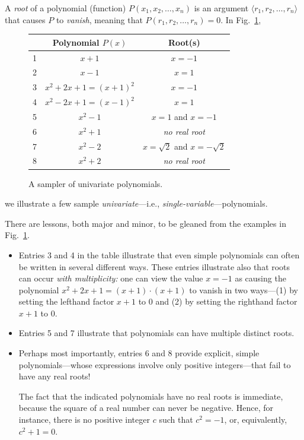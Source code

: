 \bigskip


A {\it root}  of a
polynomial (function) $P(x_1, x_2, \ldots, x_n)$ is an argument $\langle r_1, r_2, \ldots, r_n \rangle$ that causes $P$ to {\it vanish}, meaning that $P(r_1, r_2, \ldots, r_n) = 0$.  In Fig.~\ref{fig:sample-polys},
 \begin{figure}[htb]
\begin{center}
\begin{tabular}{|c|c|c|}
\hline
 & Polynomial $P(x)$ & Root(s) \\
\hline
1 &
$x+1$  &  $x= -1$ \\
2 &
$x-1$  &  $x= 1$ \\
3 &
$x^2 + 2x +1 = (x+1)^2$ & $x = -1$ \\ 
4 &
$x^2 - 2x +1 = (x-1)^2$ & $x = 1$ \\ 
5 &
$x^2 - 1$ & $x = 1$ and $x= -1$ \\
6 &
$x^2 + 1$ & {\em no real root} \\
7 &
$x^2 -2$  & $x = \sqrt{2}$ and $x = - \sqrt{2}$ \\
8 &
$x^2 + 2$ & {\em no real root} \\
\hline
\end{tabular}
\end{center} 
 \caption{A sampler of univariate polynomials.}
 \label{fig:sample-polys}
 \end{figure}
we illustrate a few sample {\em univariate}---i.e., {\em single-variable}---polynomials.  

\medskip

\noindent
There are lessons, both major and minor, to be gleaned from the examples in Fig.~\ref{fig:sample-polys}.
\begin{itemize}
\item
Entries 3 and 4 in the table illustrate that even simple polynomials can often be written in several different ways.  These entries illustrate also that roots can occur {\em with multiplicity:} one can view the value $x = -1$ as causing the polynomial $x^2 + 2x +1 = (x+1)\cdot (x+1)$ to vanish
in two ways---(1) by setting the lefthand factor $x+1$ to $0$ and (2) by setting the righthand factor $x+1$ to $0$.


\medskip\item
Entries 5 and 7 illustrate that polynomials can have multiple distinct roots.

\medskip\item
Perhaps most importantly, entries 6 and 8 provide explicit, simple polynomials---whose expressions involve only positive integers---that fail to have any real roots!

\smallskip

The fact that the indicated polynomials have no real roots is immediate, because the square of a real number can never be negative. Hence, for instance, there is no positive integer $c$ such that $c^2 = -1$, or, equivalently, $c^2 + 1 = 0$.
\end{itemize}

